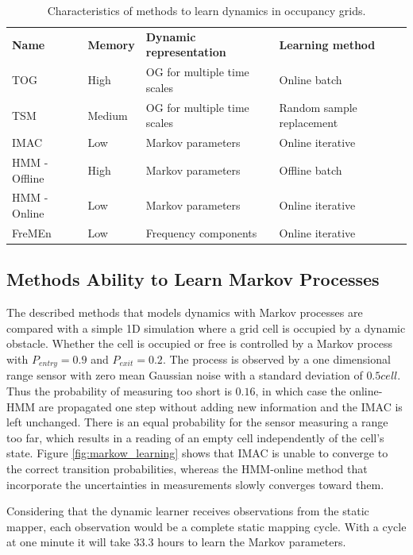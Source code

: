 \begin{table}[htbp]
    \centering
    \caption{Characteristics of methods to learn dynamics in occupancy grids.}
    \label{tab:learners_characteristics}
    \begin{tabular}{p{2.6cm} | p{1.6cm} | p{} | p{2.6cm}}
        \toprule
        \textbf{Name} & \textbf{Memory} & \textbf{Dynamic representation} & \textbf{Learning method}  \\
        \rowcolor[gray]{0.925}
        TOG & High & OG for multiple time scales & Online batch  \\
        TSM & Medium & OG for multiple time scales & Random sample replacement  \\
        \rowcolor[gray]{0.925}
        IMAC & Low & Markov parameters & Online iterative  \\
        HMM - Offline & High & Markov parameters & Offline batch  \\
        \rowcolor[gray]{0.925} 
        HMM - Online & Low & Markov parameters & Online iterative  \\
        FreMEn & Low & Frequency components & Online iterative \\
        \bottomrule
    \end{tabular}
\end{table}

\subsection{Methods Ability to Learn Markov Processes}
The described  methods that models dynamics with Markov processes are compared with a simple 1D simulation where a grid cell is occupied by a dynamic obstacle. 
Whether the cell is occupied or free is controlled by a Markov process with $P_{entry}=0.9$ and $P_{exit}=0.2$. 
The process is observed by a one dimensional range sensor with zero mean Gaussian noise with a standard deviation of $0.5cell$.
Thus the probability of measuring too short is $0.16$, in which case the online-HMM are propagated one step without adding new information and the IMAC is left unchanged.
There is an equal probability for the sensor measuring a range too far, which results in a reading of an empty cell independently of the cell's state. 
Figure \ref{fig:markow_learning} shows that IMAC is unable to converge to the correct transition probabilities, whereas the HMM-online method that incorporate the uncertainties in measurements slowly converges toward them.

Considering that the dynamic learner receives observations from the static mapper, each observation would be a complete static mapping cycle. With a cycle at one minute it will take $33.3$ hours to learn the Markov parameters. 

